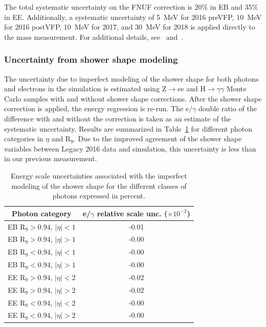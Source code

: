 The total systematic uncertainty on the FNUF correction is 20\% in EB and 35\% in EE. Additionally, a systematic uncertainty of 5~MeV for 2016 preVFP, 10~MeV for 2016 postVFP, 10~MeV for 2017, and 30~MeV for 2018 is applied directly to the mass measurement. For additional details, see~\cite{FNUF1} and~\cite{FNUF_uncertainties}. 





\subsubsection{Uncertainty from shower shape modeling}

The uncertainty due to imperfect modeling of the shower shape for both photons and electrons in the simulation is estimated using Z$\rightarrow$ee and H$\rightarrow\gamma\gamma$ Monte Carlo samples with and without shower shape corrections. After the shower shape correction is applied, the energy regression is re-run. The e/$\gamma$ double ratio of the difference with and without the correction is taken as an estimate of the systematic uncertainty. Results are summarized in Table~\ref{tab:shower_shape_unc} for different photon categories in $\eta$ and R$_9$. Due to the improved agreement of the shower shape variables between Legacy 2016 data and simulation, this uncertainty is less than in our previous measurement.

\begin{table}[h]
    \centering
    \begin{tabular}{|c|c|}
        \hline
        \textbf{Photon category} & \textbf{e/$\gamma$ relative scale unc.} ($\times 10^{-2}$)  \\ \hline
         EB R$_9 > 0.94$, $|\eta| < 1$ & -0.01 \\
         EB R$_9 > 0.94$, $|\eta| > 1$ & -0.00 \\
         EB R$_9 < 0.94$, $|\eta| < 1$ & -0.00 \\
         EB R$_9 < 0.94$, $|\eta| > 1$ & -0.00 \\ \hline
         EE R$_9 > 0.94$, $|\eta| < 2$ & -0.02 \\
         EE R$_9 > 0.94$, $|\eta| > 2$ & -0.02 \\
         EE R$_9 < 0.94$, $|\eta| < 2$ & -0.00 \\
         EE R$_9 < 0.94$, $|\eta| > 2$ & -0.00 \\ \hline
         
    \end{tabular}
    \caption[Shower shape uncertainties]{Energy scale uncertainties associated with the imperfect modeling of the shower shape for the different classes of photons expressed in percent.}
    \label{tab:shower_shape_unc}
\end{table}


